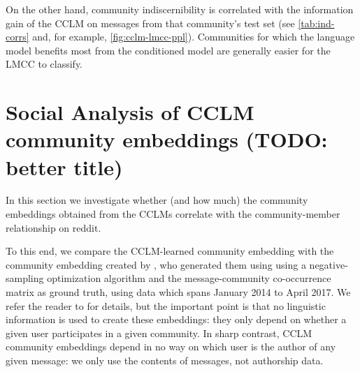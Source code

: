 \documentclass[11pt]{article}
\begin{document}

On the other hand, community indiscernibility is correlated with
the information gain of the CCLM
on messages from that community's test set
(see \cref{tab:ind-corrs} and, for example, \cref{fig:cclm-lmcc-ppl}).
Communities for which the language model benefits most from 
the conditioned model are generally easier for the LMCC to classify.











\section{Social Analysis of CCLM community embeddings (TODO: better title)}

In this section we investigate whether (and how much) the community
embeddings obtained from the CCLMs correlate with the community-member
relationship on reddit.

To this end, we compare the CCLM-learned community
embedding with the community embedding created by \citet{Kumar2018},
who generated them using using a negative-sampling optimization
algorithm and the message-community co-occurrence matrix as ground
truth, using data which spans January 2014 to April 2017.
We refer the reader
to \citet{Kumar2018}
for details, but the important point is that no linguistic
information is used to create these embeddings: they only depend on
whether a given user participates in a given
community. In sharp contrast, CCLM community embeddings depend in no
way on which user is the author of any given message: we only use the
contents of messages, not authorship data.
%
\end{document}
